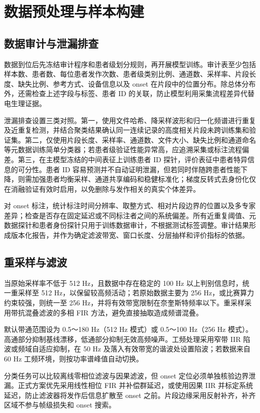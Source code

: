 \documentclass{cumcmthesis}
\numberwithin{figure}{section} %
\numberwithin{table}{section} %
\begin{document}
\clearpage

\section{数据预处理与样本构建}
\subsection{数据审计与泄漏排查}
数据到位后先冻结审计程序和患者级划分规则，再开展模型训练。审计表至少包括样本数、患者数、每位患者发作次数、患者级类别比例、通道数、采样率、片段长度、缺失比例、参考方式、设备信息以及 onset 在片段中的位置分布。除总体分布外，还需检查上述字段与标签、患者 ID 的关联，防止模型利用采集流程差异代替电生理证据。

泄漏排查设置三类对照。第一，使用文件哈希、降采样波形和归一化频谱进行重复及近重复检测，并结合聚类结果确认同一连续记录的高度相关片段未跨训练集和验证集。第二，仅使用片段长度、采样率、通道数、文件大小、缺失比例和通道命名等元数据训练简单分类器；若患者级验证性能异常高，应追溯采集或标注流程偏差。第三，在主模型冻结的中间表征上训练患者 ID 探针，评价表征中患者特异信息的可分性。患者 ID 容易预测并不自动证明泄漏，但若同时伴随跨患者性能下降，则需加强患者均衡采样、通道共享编码和稳健标准化；梯度反转式去身份化仅在消融验证有效时启用，以免删除与发作相关的真实个体差异。

对 onset 标注，统计标注时间分辨率、取整方式、相对片段边界的位置以及多专家差异；检查是否存在固定延迟或不同标注者之间的系统偏差。所有近重复阈值、元数据探针和患者身份探针只用于训练数据审计，不根据测试标签调整。审计结果形成版本化报告，并作为确定滤波带宽、窗口长度、分层抽样和评价指标的依据。

\subsection{重采样与滤波}
当原始采样率不低于 512 Hz，且数据中存在稳定的 100 Hz 以上判别信息时，统一重采样至 512 Hz，以保留较高频活动；若原始数据主要为 256 Hz，或比赛算力约束较强，则统一至 256 Hz，并将有效带宽限制在奈奎斯特频率以下。重采样采用带抗混叠滤波的多相 FIR 方法，避免直接抽取造成频谱混叠。

默认带通范围设为 0.5～180 Hz（512 Hz 模式）或 0.5～100 Hz（256 Hz 模式）。高通部分抑制基线漂移，低通部分抑制无效高频噪声。工频处理采用窄带 IIR 陷波或频域自适应抑制，在 50 Hz 及落入有效带宽的谐波处设置陷波；若数据来自 60 Hz 工频环境，则按功率谱峰值自动切换。

分类任务可以比较离线零相位滤波与因果滤波，但 onset 定位必须单独核验边界泄漏。正式方案优先采用线性相位 FIR 并补偿群延迟，或使用因果 IIR 并标定系统延迟，防止滤波器将发作后信息扩散至 onset 之前。片段边缘采用反射补齐，补齐区域不参与帧级损失和 onset 搜索。
\end{document}
